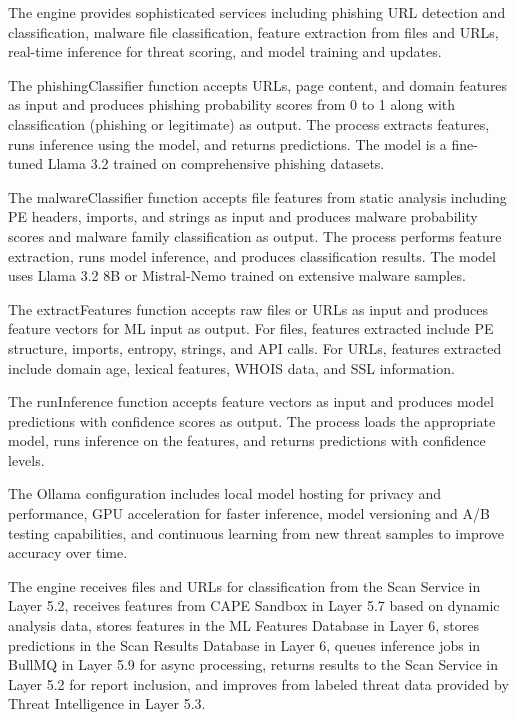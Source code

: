 \documentclass[12pt,a4paper]{report}
\begin{document}
The engine provides sophisticated services including phishing URL detection and classification, malware file classification, feature extraction from files and URLs, real-time inference for threat scoring, and model training and updates.

The phishingClassifier function accepts URLs, page content, and domain features as input and produces phishing probability scores from 0 to 1 along with classification (phishing or legitimate) as output. The process extracts features, runs inference using the model, and returns predictions. The model is a fine-tuned Llama 3.2 trained on comprehensive phishing datasets.

The malwareClassifier function accepts file features from static analysis including PE headers, imports, and strings as input and produces malware probability scores and malware family classification as output. The process performs feature extraction, runs model inference, and produces classification results. The model uses Llama 3.2 8B or Mistral-Nemo trained on extensive malware samples.

The extractFeatures function accepts raw files or URLs as input and produces feature vectors for ML input as output. For files, features extracted include PE structure, imports, entropy, strings, and API calls. For URLs, features extracted include domain age, lexical features, WHOIS data, and SSL information.

The runInference function accepts feature vectors as input and produces model predictions with confidence scores as output. The process loads the appropriate model, runs inference on the features, and returns predictions with confidence levels.

The Ollama configuration includes local model hosting for privacy and performance, GPU acceleration for faster inference, model versioning and A/B testing capabilities, and continuous learning from new threat samples to improve accuracy over time.

The engine receives files and URLs for classification from the Scan Service in Layer 5.2, receives features from CAPE Sandbox in Layer 5.7 based on dynamic analysis data, stores features in the ML Features Database in Layer 6, stores predictions in the Scan Results Database in Layer 6, queues inference jobs in BullMQ in Layer 5.9 for async processing, returns results to the Scan Service in Layer 5.2 for report inclusion, and improves from labeled threat data provided by Threat Intelligence in Layer 5.3.
\end{document}
